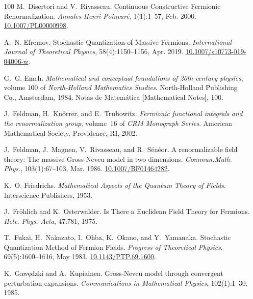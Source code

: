 \documentclass[11pt]{article}
\newcommand{\tmtextit}[1]{{\itshape{#1}}}
\begin{document}
\begin{thebibliography}{100}
  M.~Disertori and V.~Rivasseau.
  {\newblock}Continuous Constructive Fermionic Renormalization.
  {\newblock}\tmtextit{Annales Henri Poincar{\'e}}, 1(1):1--57, Feb. 2000.
  {\newblock}\href{https://doi.org/10.1007/PL00000998}{10.1007/PL00000998}.
  
  A.~N. Efremov. {\newblock}Stochastic
  Quantization of Massive Fermions. {\newblock}\tmtextit{International Journal
  of Theoretical Physics}, 58(4):1150--1156, Apr. 2019. {\newblock}
  \href{https://doi.org/10.1007/s10773-019-04006-w}{10.1007/s10773-019-04006-w}.
  
  G.~G. Emch. {\newblock}\tmtextit{Mathematical and
  conceptual foundations of 20th-century physics}, volume 100 of
  \tmtextit{North-Holland Mathematics Studies}. {\newblock}North-Holland
  Publishing Co., Amsterdam, 1984. {\newblock}Notas de Matem{\'a}tica
  [Mathematical Notes], 100.
  
  J.~Feldman, H.~Kn{\"o}rrer, and E.~Trubowitz.
  {\newblock}\tmtextit{Fermionic functional integrals and the renormalization
  group}, volume~16 of \tmtextit{CRM Monograph Series}. {\newblock}American
  Mathematical Society, Providence, RI, 2002.
  
  J.~Feldman, J.~Magnen,
  V.~Rivasseau, and R.~S{\'e}n{\'e}or. {\newblock}A renormalizable field
  theory: The massive Gross-Neveu model in two dimensions.
  {\newblock}\tmtextit{Commun.Math. Phys.}, 103(1):67--103, Mar. 1986.
  {\newblock}\href{https://doi.org/10.1007/BF01464282}{10.1007/BF01464282}.
  
  K.~O. Friedrichs.
  {\newblock}\tmtextit{Mathematical Aspects of the Quantum Theory of Fields}.
  {\newblock}Interscience Publishers, 1953.
  
  J.~Fr{\"o}hlich and K.~Osterwalder.
  {\newblock}Is There a Euclidean Field Theory for Fermions.
  {\newblock}\tmtextit{Helv. Phys. Acta}, 47:781, 1975.
  
  T.~Fukai, H.~Nakazato, I.~Ohba, K.~Okano,
  and Y.~Yamanaka. {\newblock}Stochastic Quantization Method of Fermion
  Fields. {\newblock}\tmtextit{Progress of Theoretical Physics},
  69(5):1600--1616, May 1983.
  {\newblock}\href{https://doi.org/10.1143/PTP.69.1600}{10.1143/PTP.69.1600}.
  
  K.~Gaw\k{e}dzki and A.~Kupiainen.
  {\newblock}Gross-Neveu model through convergent perturbation expansions.
  {\newblock}\tmtextit{Communications in Mathematical Physics}, 102(1):1--30,
  1985.
  

\end{thebibliography}
\end{document}

